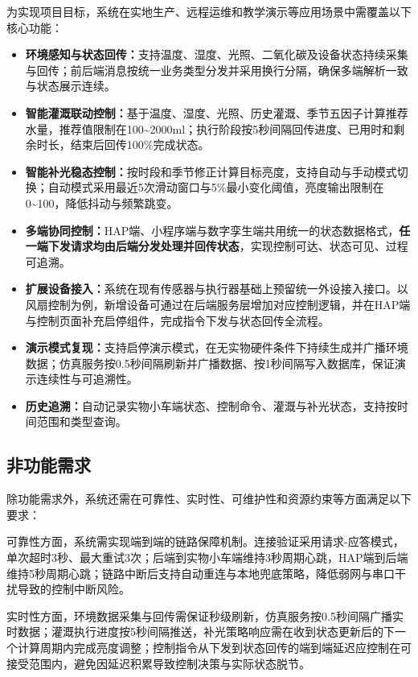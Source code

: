 \documentclass{article}
\begin{document}
为实现项目目标，系统在实地生产、远程运维和教学演示等应用场景中需覆盖以下核心功能：
\begin{itemize}[leftmargin=2em,itemsep=0.2em,topsep=0.2em]
  \item \textbf{环境感知与状态回传：}支持温度、湿度、光照、二氧化碳及设备状态持续采集与回传；前后端消息按统一业务类型分发并采用换行分隔，确保多端解析一致与状态展示连续。
  \item \textbf{智能灌溉联动控制：}基于温度、湿度、光照、历史灌溉、季节五因子计算推荐水量，推荐值限制在100\textasciitilde2000ml；执行阶段按5秒间隔回传进度、已用时和剩余时长，结束后回传100\%完成状态。
  \item \textbf{智能补光稳态控制：}按时段和季节修正计算目标亮度，支持自动与手动模式切换；自动模式采用最近5次滑动窗口与5\%最小变化阈值，亮度输出限制在0\textasciitilde100，降低抖动与频繁跳变。
  \item \textbf{多端协同控制：}HAP端、小程序端与数字孪生端共用统一的状态数据格式，\textbf{任一端下发请求均由后端分发处理并回传状态}，实现控制可达、状态可见、过程可追溯。
  \item \textbf{扩展设备接入：}系统在现有传感器与执行器基础上预留统一外设接入接口。以风扇控制为例，新增设备可通过在后端服务层增加对应控制逻辑，并在HAP端与控制页面补充启停组件，完成指令下发与状态回传全流程。
  \item \textbf{演示模式复现：}支持启停演示模式，在无实物硬件条件下持续生成并广播环境数据；仿真服务按0.5秒间隔刷新并广播数据、按1秒间隔写入数据库，保证演示连续性与可追溯性。
  \item \textbf{历史追溯：}自动记录实物小车端状态、控制命令、灌溉与补光状态，支持按时间范围和类型查询。
\end{itemize}

\subsection{非功能需求}

除功能需求外，系统还需在可靠性、实时性、可维护性和资源约束等方面满足以下要求：

可靠性方面，系统需实现端到端的链路保障机制。连接验证采用请求-应答模式，单次超时3秒、最大重试3次；后端到实物小车端维持3秒周期心跳，HAP端到后端维持5秒周期心跳；链路中断后支持自动重连与本地兜底策略，降低弱网与串口干扰导致的控制中断风险。

实时性方面，环境数据采集与回传需保证秒级刷新，仿真服务按0.5秒间隔广播实时数据；灌溉执行进度按5秒间隔推送，补光策略响应需在收到状态更新后的下一个计算周期内完成亮度调整；控制指令从下发到状态回传的端到端延迟应控制在可接受范围内，避免因延迟积累导致控制决策与实际状态脱节。
\end{document}
